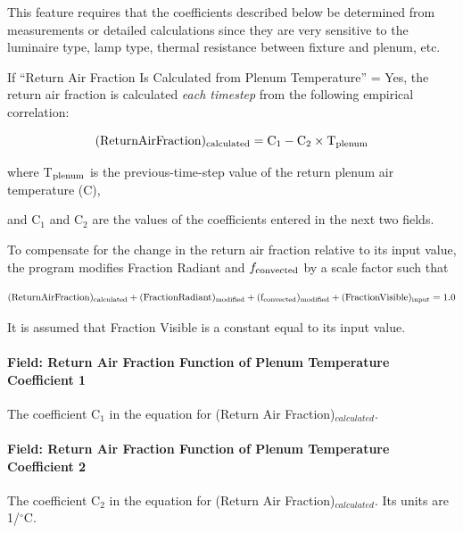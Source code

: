 This feature requires that the coefficients described below be determined from measurements or detailed calculations since they are very sensitive to the luminaire type, lamp type, thermal resistance between fixture and plenum, etc.

If ``Return Air Fraction Is Calculated from Plenum Temperature'' = Yes, the return air fraction is calculated \emph{each timestep} from the following empirical correlation:

\begin{equation}
  (\rm{Return Air Fraction})_{\rm{calculated}} = C_{1} - C_{2} \times T_{\rm{plenum}}
\end{equation}

where T\(_{\rm{plenum}}\) is the previous-time-step value of the return plenum air temperature (C),

and C\(_{1}\) and C\(_{2}\) are the values of the coefficients entered in the next two fields.

To compensate for the change in the return air fraction relative to its input value, the program modifies Fraction Radiant and \(f_{\rm{convected}}\) by a scale factor such that

\begin{equation}
  (\rm{Return Air Fraction})_{\rm{calculated}} + (\rm{Fraction Radiant})_{\rm{modified}} + (f_{\rm{convected}})_{\rm{modified}} + (\rm{Fraction Visible})_{\rm{input}} = 1.0
\end{equation}

It is assumed that Fraction Visible is a constant equal to its input value.

\paragraph{Field: Return Air Fraction Function of Plenum Temperature Coefficient 1}\label{field-return-air-fraction-function-of-plenum-temperature-coefficient-1-lights-definition}

The coefficient C\(_{1}\) in the equation for (Return Air Fraction)\(_{calculated}\).

\paragraph{Field: Return Air Fraction Function of Plenum Temperature Coefficient 2}\label{field-return-air-fraction-function-of-plenum-temperature-coefficient-2-lights-definition}

The coefficient C\(_{2}\) in the equation for (Return Air Fraction)\(_{calculated}\). Its units are 1/$^\circ$C.

